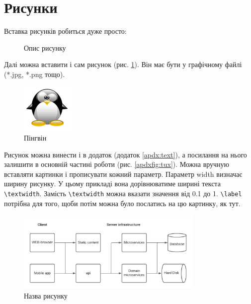 \section{Рисунки}

Вставка рисунків робиться дуже просто:

\begin{figure}[h]
\caption{Опис рисунку}
\end{figure}

Далі можна вставити і сам рисунок (рис. \ref{fig:tux}). Він має бути у графічному файлі ({*}.jpg, {*}.png тощо). 

\begin{figure}[h]
 \centering\includegraphics{img/Tux.png}
 \caption{Пінгвін}
 \label{fig:tux}
\end{figure}


Рисунок можна винести і в додаток (додаток \ref{apdx:text}), \label{linkpage} а посилання на нього залишити в основній частині роботи (рис. \ref{apdxfig:tux}).
Можна вручную вставляти картинки і прописувати кожний параметр.
Параметр width визначає ширину рисунку. У цьому прикладі вона дорівнюватиме ширині текста \verb|\textwidth|. Замість \verb|\textwidth| можна вказати значення від 0.1 до 1. \verb|\label| потрібна для того, щоби потім можна було послатись на цю картинку, як тут.

\begin{figure}[!htb]
 \centering
 \includegraphics[width=0.8\textwidth]{img/fig1.png}
 \caption{Назва рисунку}
 \label{fig:fig1}
\end{figure}

